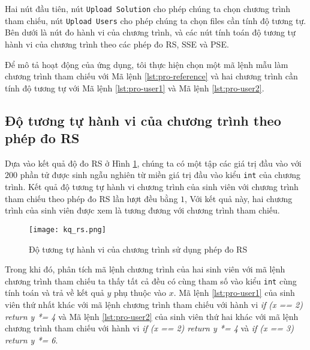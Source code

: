 Hai nút đầu tiên, nút \texttt{Upload Solution} cho phép chúng ta chọn chương trình tham chiếu, nút \texttt{Upload Users} cho phép chúng ta chọn files cần tính độ tương tự. Bên dưới là nút đo hành vi của chương trình, và các nút tính toán độ tương tự hành vi của chương trình theo các phép đo RS, SSE và PSE.

Để mô tả hoạt động của ứng dụng, tôi thực hiện chọn một mã lệnh mẫu làm chương trình tham chiếu với Mã lệnh \ref{lst:pro-reference} và hai chương trình cần tính độ tương tự với Mã lệnh \ref{lst:pro-user1} và Mã lệnh \ref{lst:pro-user2}.






\subsection{Độ tương tự hành vi của chương trình theo phép đo RS}
Dựa vào kết quả độ đo RS ở Hình \ref{fig:result-RS}, chúng ta có một tập các giá trị đầu vào với $ 200 $ phần tử được sinh ngẫu nghiên từ miền giá trị đầu vào kiểu \texttt{int} của chương trình. Kết quả độ tương tự hành vi chương trình của sinh viên với chương trình tham chiếu theo phép đo RS lần lượt đều bằng $ 1 $, Với kết quả này, hai chương trình của sinh viên được xem là tương đương với chương trình tham chiếu. 

\begin{figure}[H]	
	\begin{center}
		\texttt{[image: kq\_rs.png]}
	\end{center}
	\caption{Độ tương tự hành vi của chương trình sử dụng phép đo RS}
	\label{fig:result-RS}
\end{figure}


Trong khi đó, phân tích mã lệnh chương trình của hai sinh viên với mã lệnh chương trình tham chiếu ta thấy tất cả đều có cùng tham số vào kiểu \texttt{int} cùng tính toán và trả về kết quả $ y $ phụ thuộc vào $ x $. Mã lệnh \ref{lst:pro-user1} của sinh viên thứ nhất khác với mã lệnh chương trình tham chiếu với hành vi \textit{if (x == 2) return y *= 4} và Mã lệnh \ref{lst:pro-user2} của sinh viên thứ hai khác với mã lệnh chương trình tham chiếu với hành vi \textit{if (x == 2) return y *= 4} và \textit{if (x == 3) return y *= 6}.

